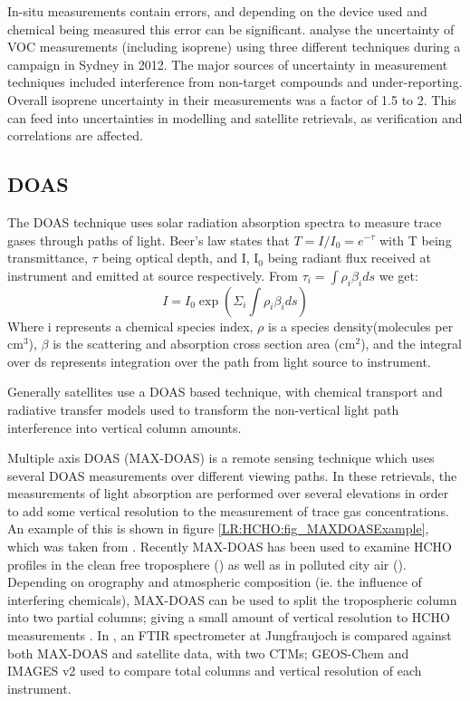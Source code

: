   In-situ measurements contain errors, and depending on the device used and chemical being measured this error can be significant.
  \cite{Dunne2017} analyse the uncertainty of VOC measurements (including isoprene) using three different techniques during a campaign in Sydney in 2012.
  The major sources of uncertainty in measurement techniques included interference from non-target compounds and under-reporting.
  Overall isoprene uncertainty in their measurements was a factor of 1.5 to 2.
  This can feed into uncertainties in modelling and satellite retrievals, as verification and correlations are affected.
  
  \subsection{DOAS}
  
    The DOAS technique uses solar radiation absorption spectra to measure trace gases through paths of light.
    Beer's law states that $ T = I/I_0 = e^{-\tau} $ with T being transmittance, $\tau$ being optical depth, and I, I$_0$ being radiant flux received at instrument and emitted at source respectively.
    From $ \tau_i = \int \rho_i \beta_i ds $ we get:
    $$ I = I_0 \exp {\left( \Sigma_i \int \rho_i \beta_i ds \right) } $$
    Where i represents a chemical species index, $\rho$ is a species density(molecules per cm$^3$), $\beta$ is the scattering and absorption cross section area (cm$^2$), and the integral over ds represents integration over the path from light source to instrument.
    
    Generally satellites use a DOAS based technique, with chemical transport and radiative transfer models used to transform the non-vertical light path interference into vertical column amounts.
    
    Multiple axis DOAS (MAX-DOAS) is a remote sensing technique which uses several DOAS measurements over different viewing paths.
    In these retrievals, the measurements of light absorption are performed over several elevations in order to add some vertical resolution to the measurement of trace gas concentrations.
    An example of this is shown in figure \ref{LR:HCHO:fig_MAXDOASExample}, which was taken from \cite{Lee2015}.
    Recently MAX-DOAS has been used to examine HCHO profiles in the clean free troposphere (\cite{Franco2015, Schreier2016}) as well as in polluted city air (\cite{Lee2015}).
    Depending on orography and atmospheric composition (ie. the influence of interfering chemicals), MAX-DOAS can be used to split the tropospheric column into two partial columns; giving a small amount of vertical resolution to HCHO measurements \citep[eg.]{Franco2015, Lee2015}.
    In \cite{Franco2015}, an FTIR spectrometer at Jungfraujoch is compared against both MAX-DOAS and satellite data, with two CTMs; GEOS-Chem and IMAGES v2 used to compare total columns and vertical resolution of each instrument.
    
